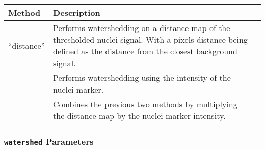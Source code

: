 \documentclass[
  letterpaper,
  DIV=11,
  numbers=noendperiod]{scrreprt}
\begin{document}
\begin{longtable}[]{@{}
  >{\raggedright\arraybackslash}p{}
  >{\centering\arraybackslash}p{}
  >{\centering\arraybackslash}p{}@{}}
\toprule\noalign{}
\begin{minipage}[b]{\linewidth}\raggedright
Method
\end{minipage} & \begin{minipage}[b]{\linewidth}\centering
Description
\end{minipage} & \begin{minipage}[b]{\linewidth}\centering
\end{minipage} \\
\midrule\noalign{}
\endhead
\bottomrule\noalign{}
\endlastfoot
{``distance''} & {Performs watershedding on a distance map of the
thresholded nuclei signal. With a pixels distance being defined as the
distance from the closest background signal.} & \\
{``intensity''} & {Performs watershedding using the intensity of the
nuclei marker.} & \\
{``combine''} & {Combines the previous two methods by multiplying the
distance map by the nuclei marker intensity.} & \\
\end{longtable}

\subsubsection{\texorpdfstring{\texttt{watershed}
Parameters}{watershed Parameters}}\label{watershed-parameters}
\end{document}
